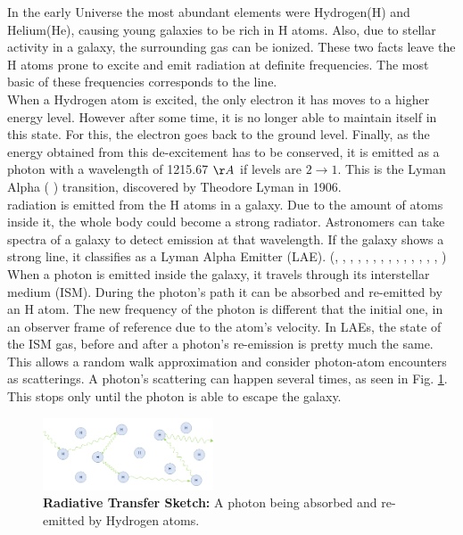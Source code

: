 \documentclass[twocolappendix]{latex/emulateapj}
\begin{document}
In the early Universe the most abundant elements were Hydrogen(H) and Helium(He), causing young galaxies to be rich in H atoms. Also, due to stellar activity in a galaxy, the surrounding gas can be ionized. These two facts leave the H atoms prone to excite and emit radiation at definite frequencies. The most basic of these frequencies corresponds to the \lya line. \cite{PartridgePeebles}  \\

When a Hydrogen atom is excited, the only electron it has moves to a higher energy level. However after some time, it is no longer able to maintain itself in this state. For this, the electron goes back to the ground level. Finally, as the energy obtained from this de-excitement has to be conserved, it is emitted as a photon with a wavelength of 1215.67 $\AA$ if levels are $2\rightarrow1$. This is the Lyman Alpha ( \lya) transition, discovered by Theodore Lyman in 1906. \cite{LymanBio} \\

\lya radiation is emitted from the H atoms in a galaxy. Due to the amount of atoms inside it, the whole body could become a strong \lya radiator. Astronomers can take spectra of a galaxy to detect emission at that wavelength. If the galaxy shows a strong \lya line, it classifies as a Lyman Alpha Emitter (LAE). (\cite{DjorgovskiThompson}, \cite{Rhoads00}, \cite{Gawiser2007}, \cite{Koehler2007}, \cite{Ouchi08}, \cite{Yamada2012}, \cite{Schenker2012}, \cite{Kulas12}, \cite{Yamada2012}, \cite{Chonis2013}, \cite{Finkelstein2013}, \cite{Ostlin14}, \cite{Hayes2014}, \cite{Faisst2014}, \cite{Fumagalli2015}) \\

When a \lya photon is emitted inside the galaxy, it travels through its interstellar medium (ISM). During the photon's path it can be absorbed and re-emitted by an H atom. The new frequency of the photon is different that the initial one, in an observer frame of reference due to the atom's velocity. In LAEs, the state of the ISM gas, before and after a photon's re-emission is pretty much the same. This allows a random walk approximation and consider photon-atom encounters as scatterings. A photon's scattering can happen several times, as seen in Fig. \ref{fig:radiative_transfer}. This stops only until the photon is able to escape the galaxy. \\

\begin{figure}[h!]
	\begin{center}
		\includegraphics[width=0.45\textwidth]{./figures/radiative_transfer}
	\end{center}
	\caption{\textbf{Radiative Transfer Sketch:} A \lya photon being absorbed and re-emitted by Hydrogen atoms. 
		\label{fig:radiative_transfer}}
\end{figure}
\end{document}

